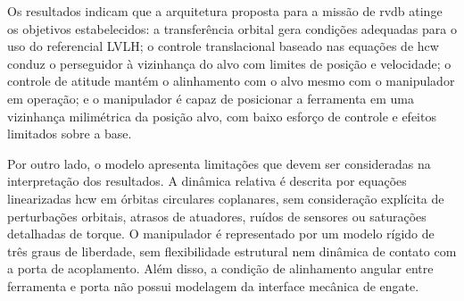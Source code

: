 Os resultados indicam que a arquitetura proposta para a missão de \gls{rvdb} atinge os objetivos estabelecidos: a transferência orbital gera condições adequadas para o uso do referencial LVLH; o controle translacional baseado nas equações de \gls{hcw} conduz o perseguidor à vizinhança do alvo com limites de posição e velocidade; o controle de atitude mantém o alinhamento com o alvo mesmo com o manipulador em operação; e o manipulador é capaz de posicionar a ferramenta em uma vizinhança milimétrica da posição alvo, com baixo esforço de controle e efeitos limitados sobre a base.

Por outro lado, o modelo apresenta limitações que devem ser consideradas na interpretação dos resultados. A dinâmica relativa é descrita por equações linearizadas \gls{hcw} em órbitas circulares coplanares, sem consideração explícita de perturbações orbitais, atrasos de atuadores, ruídos de sensores ou saturações detalhadas de torque. O manipulador é representado por um modelo rígido de três graus de liberdade, sem flexibilidade estrutural nem dinâmica de contato com a porta de acoplamento. Além disso, a condição de alinhamento angular entre ferramenta e porta não possui modelagem da interface mecânica de engate.


